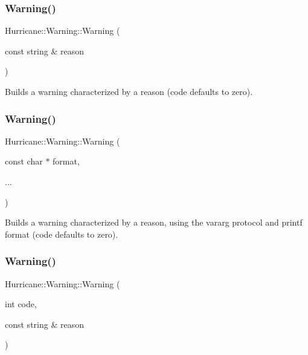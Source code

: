 \subsubsection{\texorpdfstring{Warning()}{Warning()}\hspace{0.1cm}{\footnotesize\ttfamily [1/5]}}
{\footnotesize\ttfamily Hurricane\+::\+Warning\+::\+Warning (\begin{DoxyParamCaption}\item[{const string \&}]{reason }\end{DoxyParamCaption})}

Builds a warning characterized by a reason (code defaults to zero). \mbox{\label{classHurricane_1_1Warning_a93bdec83d118f235def1d354938c0529}} 
\subsubsection{\texorpdfstring{Warning()}{Warning()}\hspace{0.1cm}{\footnotesize\ttfamily [2/5]}}
{\footnotesize\ttfamily Hurricane\+::\+Warning\+::\+Warning (\begin{DoxyParamCaption}\item[{const char $\ast$}]{format,  }\item[{}]{... }\end{DoxyParamCaption})}

Builds a warning characterized by a reason, using the {\ttfamily vararg} protocol and {\ttfamily printf} format (code defaults to zero). \mbox{\label{classHurricane_1_1Warning_a95e98968e28550678f1ed91193f8ee5f}} 
\subsubsection{\texorpdfstring{Warning()}{Warning()}\hspace{0.1cm}{\footnotesize\ttfamily [3/5]}}
{\footnotesize\ttfamily Hurricane\+::\+Warning\+::\+Warning (\begin{DoxyParamCaption}\item[{int}]{code,  }\item[{const string \&}]{reason }\end{DoxyParamCaption})}

